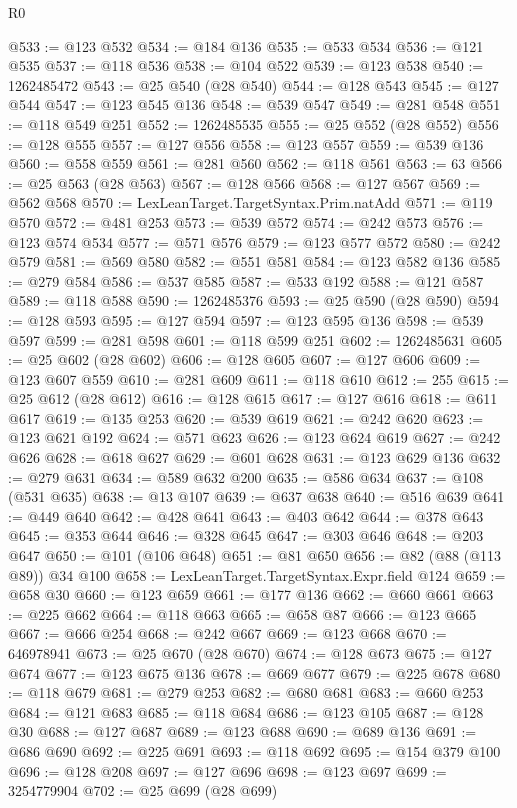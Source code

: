 \begin{lexlean}{R0}
\begin{coremodule}
@533 := @123 @532
@534 := @184 @136
@535 := @533 @534
@536 := @121 @535
@537 := @118 @536
@538 := @104 @522
@539 := @123 @538
@540 := 1262485472
@543 := @25 @540 (@28 @540)
@544 := @128 @543
@545 := @127 @544
@547 := @123 @545 @136
@548 := @539 @547
@549 := @281 @548
@551 := @118 @549 @251
@552 := 1262485535
@555 := @25 @552 (@28 @552)
@556 := @128 @555
@557 := @127 @556
@558 := @123 @557
@559 := @539 @136
@560 := @558 @559
@561 := @281 @560
@562 := @118 @561
@563 := 63
@566 := @25 @563 (@28 @563)
@567 := @128 @566
@568 := @127 @567
@569 := @562 @568
@570 := LexLeanTarget.TargetSyntax.Prim.natAdd
@571 := @119 @570
@572 := @481 @253
@573 := @539 @572
@574 := @242 @573
@576 := @123 @574 @534
@577 := @571 @576
@579 := @123 @577 @572
@580 := @242 @579
@581 := @569 @580
@582 := @551 @581
@584 := @123 @582 @136
@585 := @279 @584
@586 := @537 @585
@587 := @533 @192
@588 := @121 @587
@589 := @118 @588
@590 := 1262485376
@593 := @25 @590 (@28 @590)
@594 := @128 @593
@595 := @127 @594
@597 := @123 @595 @136
@598 := @539 @597
@599 := @281 @598
@601 := @118 @599 @251
@602 := 1262485631
@605 := @25 @602 (@28 @602)
@606 := @128 @605
@607 := @127 @606
@609 := @123 @607 @559
@610 := @281 @609
@611 := @118 @610
@612 := 255
@615 := @25 @612 (@28 @612)
@616 := @128 @615
@617 := @127 @616
@618 := @611 @617
@619 := @135 @253
@620 := @539 @619
@621 := @242 @620
@623 := @123 @621 @192
@624 := @571 @623
@626 := @123 @624 @619
@627 := @242 @626
@628 := @618 @627
@629 := @601 @628
@631 := @123 @629 @136
@632 := @279 @631
@634 := @589 @632 @200
@635 := @586 @634
@637 := @108 (@531 @635)
@638 := @13 @107
@639 := @637 @638
@640 := @516 @639
@641 := @449 @640
@642 := @428 @641
@643 := @403 @642
@644 := @378 @643
@645 := @353 @644
@646 := @328 @645
@647 := @303 @646
@648 := @203 @647
@650 := @101 (@106 @648)
@651 := @81 @650
@656 := @82 (@88 (@113 @89)) @34 @100
@658 := LexLeanTarget.TargetSyntax.Expr.field @124
@659 := @658 @30
@660 := @123 @659
@661 := @177 @136
@662 := @660 @661
@663 := @225 @662
@664 := @118 @663
@665 := @658 @87
@666 := @123 @665
@667 := @666 @254
@668 := @242 @667
@669 := @123 @668
@670 := 646978941
@673 := @25 @670 (@28 @670)
@674 := @128 @673
@675 := @127 @674
@677 := @123 @675 @136
@678 := @669 @677
@679 := @225 @678
@680 := @118 @679
@681 := @279 @253
@682 := @680 @681
@683 := @660 @253
@684 := @121 @683
@685 := @118 @684
@686 := @123 @105
@687 := @128 @30
@688 := @127 @687
@689 := @123 @688
@690 := @689 @136
@691 := @686 @690
@692 := @225 @691
@693 := @118 @692
@695 := @154 @379 @100
@696 := @128 @208
@697 := @127 @696
@698 := @123 @697
@699 := 3254779904
@702 := @25 @699 (@28 @699)

\end{coremodule}
\end{lexlean}
